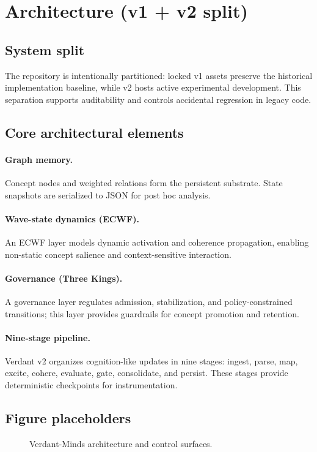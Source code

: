 \section{Architecture (v1 + v2 split)}
\subsection{System split}
The repository is intentionally partitioned: locked v1 assets preserve the historical implementation baseline, while v2 hosts active experimental development. This separation supports auditability and controls accidental regression in legacy code.

\subsection{Core architectural elements}
\paragraph{Graph memory.}
Concept nodes and weighted relations form the persistent substrate. State snapshots are serialized to JSON for post hoc analysis.

\paragraph{Wave-state dynamics (ECWF).}
An ECWF layer models dynamic activation and coherence propagation, enabling non-static concept salience and context-sensitive interaction.

\paragraph{Governance (Three Kings).}
A governance layer regulates admission, stabilization, and policy-constrained transitions; this layer provides guardrails for concept promotion and retention.

\paragraph{Nine-stage pipeline.}
Verdant v2 organizes cognition-like updates in nine stages: ingest, parse, map, excite, cohere, evaluate, gate, consolidate, and persist. These stages provide deterministic checkpoints for instrumentation.

\subsection{Figure placeholders}
\begin{figure}[h]
  \centering
  \caption{Verdant-Minds architecture and control surfaces.}
\end{figure}
